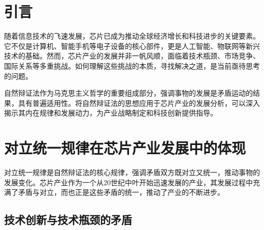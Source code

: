 \documentclass[12pt,hyperref,a4paper,UTF8]{ctexart}
\begin{document}
\cover
\newpage

\begin{abstract}

芯片产业作为现代信息社会的核心支撑，其发展深刻影响着全球经济和科技进步。本文从自然辩证法的角度出发，分析芯片产业的发展历程和现状，探讨其内在矛盾与发展规律，以期为理解和推动芯片产业的未来发展提供理论参考。

\vspace{1em}

\noindent
\textbf{关键词：}自然辩证法；芯片产业；矛盾；发展规律；科技创新
\end{abstract}

\thispagestyle{empty} %


\newpage


\section{引言}

随着信息技术的飞速发展，芯片已成为推动全球经济增长和科技进步的关键要素。它不仅是计算机、智能手机等电子设备的核心部件，更是人工智能、物联网等新兴技术的基础。然而，芯片产业的发展并非一帆风顺，面临着技术瓶颈、市场竞争、国际关系等多重挑战。如何理解这些挑战的本质，寻找解决之道，是当前亟待思考的问题。

自然辩证法作为马克思主义哲学的重要组成部分，强调事物的发展是矛盾运动的结果，具有普遍适用性。将自然辩证法的思想应用于芯片产业的发展分析，可以深入揭示其内在规律和发展动力，为产业战略制定和科技创新提供指导。

\section{对立统一规律在芯片产业发展中的体现}

对立统一规律是自然辩证法的核心规律，强调矛盾双方既对立又统一，推动事物的发展变化。芯片产业作为一个从20世纪中叶开始迅速发展的产业，其发展过程中充满了矛盾与对立，而也正是这些矛盾的统一，推动了产业的不断进步。

\subsection{技术创新与技术瓶颈的矛盾}
\end{document}
